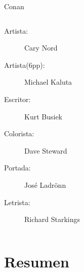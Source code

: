 \begin{frame}{Conan}
\begin{columns}
\begin{itemize}
         \begin{description}
            \item[Artista:] Cary Nord
            \item[Artista(6pp):] Michael Kaluta
            \item[Escritor:] Kurt Busiek
            \item[Colorista:] Dave Steward
            \item[Portada:] José Ladrönn
            \item[Letrista:] Richard Starkings
         \end{description}
    \end{itemize}
\end{columns}
\end{frame}


\section{Resumen}

